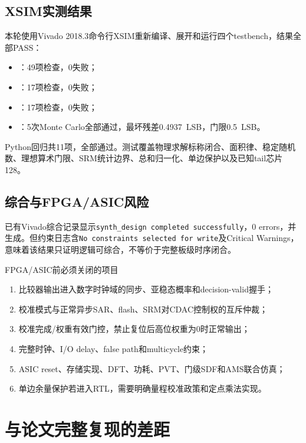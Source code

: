 \documentclass[11pt,a4paper,UTF8,fontset=none,openany]{ctexrep}
\numberwithin{equation}{chapter}
\numberwithin{figure}{chapter}
\numberwithin{table}{chapter}
\begin{document}
\section{XSIM实测结果}

本轮使用Vivado 2018.3命令行XSIM重新编译、展开和运行四个testbench，结果全部PASS：
\begin{itemize}
  \item {}：49项检查，0失败；
  \item {}：17项检查，0失败；
  \item {}：17项检查，0失败；
  \item {}：5次Monte Carlo全部通过，最坏残差\SI{0.4937}{LSB}，门限\SI{0.5}{LSB}。
\end{itemize}
Python回归共11项，全部通过。测试覆盖物理求解标称闭合、面积律、稳定随机数、理想算术门限、SRM统计边界、总和归一化、单边保护以及已知tail芯片128。

\section{综合与FPGA/ASIC风险}

已有Vivado综合记录显示\texttt{synth\_design completed successfully}，0 errors，并生成。但约束日志含\texttt{No constraints selected for write}及Critical Warnings，意味着该结果只证明逻辑可综合，不等价于完整板级时序闭合。

\begin{riskbox}{FPGA/ASIC前必须关闭的项目}
\begin{enumerate}
  \item 比较器输出进入数字时钟域的同步、亚稳态概率和decision-valid握手；
  \item 校准模式与正常异步SAR、flash、SRM对CDAC控制权的互斥仲裁；
  \item 校准完成/权重有效门控，禁止复位后高位权重为0时正常输出；
  \item 完整时钟、I/O delay、false path和multicycle约束；
  \item ASIC reset、存储实现、DFT、功耗、PVT、门级SDF和AMS联合仿真；
  \item 单边余量保护若进入RTL，需要明确量程校准政策和定点乘法实现。
\end{enumerate}
\end{riskbox}

\chapter{与论文完整复现的差距}
\end{document}
